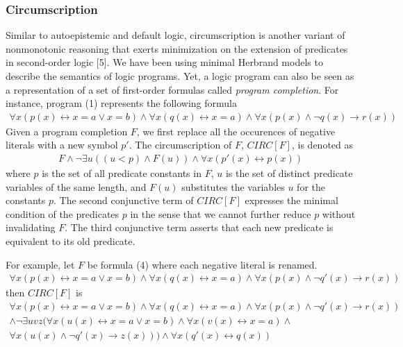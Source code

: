 \subsubsection{Circumscription}
Similar to autoepistemic and default logic, circumscription is another variant of 
nonmonotonic reasoning that exerts minimization on the extension of predicates in 
second-order logic [5]. We have been using minimal Herbrand models to describe the semantics 
of logic programs. Yet, a logic program can also be seen as a representation of a set of 
first-order formulas called \emph{program completion}. For instance, program (1) 
represents the following formula
\begin{align}
    \forall x (p(x) \leftrightarrow x = a \lor x = b) \land 
    \forall x (q(x) \leftrightarrow x = a) \land 
    \forall x (p(x) \land \neg q(x) \rightarrow r(x))
\end{align}
Given a program completion $F$, we first replace all the occurences of negative literals 
with a new symbol $p'$. The circumscription of $F$, $CIRC[F]$, is denoted as 
\begin{align}
    F \land \neg \exists u((u < p) \land F(u)) \land \forall x (p'(x) \leftrightarrow p(x))
\end{align}
where $p$ is the set of all predicate constants in $F$, $u$ is the set of distinct 
predicate variables of the same length, and $F(u)$ substitutes the variables $u$ for 
the constants $p$. The second conjunctive term of $CIRC[F]$ expresses the minimal 
condition of the predicates $p$ in the sense that we cannot further reduce $p$ without 
invalidating $F$. The third conjunctive term asserts that each new predicate is 
equivalent to its old predicate.

For example, let $F$ be formula (4) where each negative literal is renamed.
\begin{align*}
    \forall x (p(x) \leftrightarrow x = a \lor x = b) \land 
    \forall x (q(x) \leftrightarrow x = a) \land 
    \forall x (p(x) \land \neg q'(x) \rightarrow r(x))
\end{align*}
then $CIRC[F]$ is 
\begin{multline*}
    \forall x (p(x) \leftrightarrow x = a \lor x = b) \land 
    \forall x (q(x) \leftrightarrow x = a) \land 
    \forall x (p(x) \land \neg q'(x) \rightarrow r(x)) \\ 
    \land \neg \exists uvz (
        \forall x (u(x) \leftrightarrow x = a \lor x = b) \land 
        \forall x (v(x) \leftrightarrow x = a) \land 
        \\ \forall x (u(x) \land \neg q'(x) \rightarrow z(x)) 
    ) 
    \land \forall x (q'(x) \leftrightarrow q(x))
\end{multline*}

